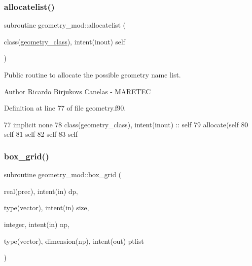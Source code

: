 \subsubsection{\texorpdfstring{allocatelist()}{allocatelist()}}
{\footnotesize\ttfamily subroutine geometry\+\_\+mod\+::allocatelist (\begin{DoxyParamCaption}\item[{class(\mbox{\hyperlink{structgeometry__mod_1_1geometry__class}{geometry\+\_\+class}}), intent(inout)}]{self }\end{DoxyParamCaption})\hspace{0.3cm}{\ttfamily [private]}}



Public routine to allocate the possible geometry name list. 

\begin{DoxyAuthor}{Author}
Ricardo Birjukovs Canelas -\/ M\+A\+R\+E\+T\+EC 
\end{DoxyAuthor}


Definition at line 77 of file geometry.\+f90.


\begin{DoxyCode}
77     \textcolor{keywordtype}{implicit none}
78     \textcolor{keywordtype}{class}(geometry\_class), \textcolor{keywordtype}{intent(inout)} :: self
79     \textcolor{keyword}{allocate}(self%
80     self%
81     self%
82     self%
83     self%
\end{DoxyCode}
\mbox{\label{namespacegeometry__mod_ae87e4ecff2d21a839da2b82919b5fd0b}} 
\subsubsection{\texorpdfstring{box\+\_\+grid()}{box\_grid()}}
{\footnotesize\ttfamily subroutine geometry\+\_\+mod\+::box\+\_\+grid (\begin{DoxyParamCaption}\item[{real(prec), intent(in)}]{dp,  }\item[{type(vector), intent(in)}]{size,  }\item[{integer, intent(in)}]{np,  }\item[{type(vector), dimension(np), intent(out)}]{ptlist }\end{DoxyParamCaption})\hspace{0.3cm}{\ttfamily [private]}}



